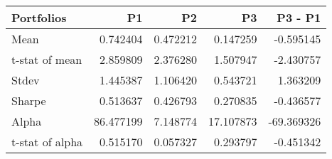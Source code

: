 \begin{tabular}{lrrrr}
\toprule
Portfolios & P1 & P2 & P3 & P3 - P1 \\
\midrule
Mean & 0.742404 & 0.472212 & 0.147259 & -0.595145 \\
t-stat of mean & 2.859809 & 2.376280 & 1.507947 & -2.430757 \\
Stdev & 1.445387 & 1.106420 & 0.543721 & 1.363209 \\
Sharpe & 0.513637 & 0.426793 & 0.270835 & -0.436577 \\
Alpha & 86.477199 & 7.148774 & 17.107873 & -69.369326 \\
t-stat of alpha & 0.515170 & 0.057327 & 0.293797 & -0.451342 \\
\bottomrule
\end{tabular}
